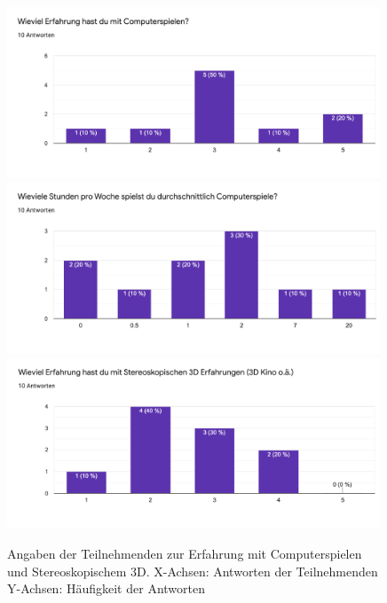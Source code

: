         \begin{figure}[!h]
            \centering
            \includegraphics[width=0.99\textwidth]{images/erfahrungpc.png}
            \includegraphics[width=0.99\textwidth]{images/pcstundenprowoche.png}
            \includegraphics[width=0.99\textwidth]{images/3derfahrung.png}
            \caption{Angaben der Teilnehmenden zur Erfahrung mit Computerspielen und Stereoskopischem 3D.
            X-Achsen: Antworten der Teilnehmenden
            Y-Achsen: Häufigkeit der Antworten}\label{figure:videogames}
        \end{figure}

